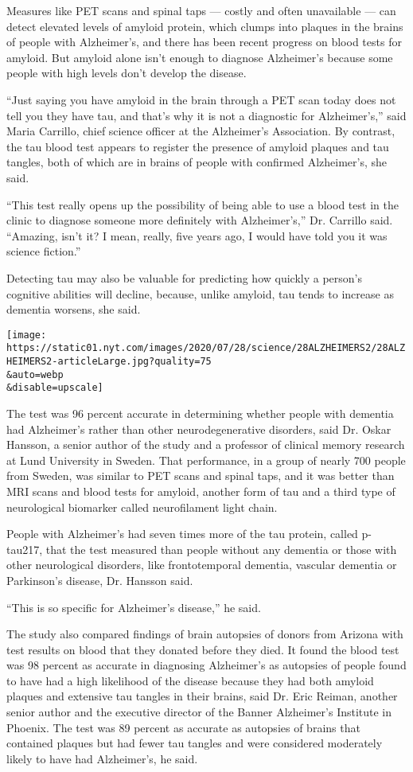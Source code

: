 Measures like PET scans and spinal taps --- costly and often unavailable
--- can detect elevated levels of amyloid protein, which clumps into
plaques in the brains of people with Alzheimer's, and there has been
recent progress on blood tests for amyloid. But amyloid alone isn't
enough to diagnose Alzheimer's because some people with high levels
don't develop the disease.

``Just saying you have amyloid in the brain through a PET scan today
does not tell you they have tau, and that's why it is not a diagnostic
for Alzheimer's,'' said Maria Carrillo, chief science officer at the
Alzheimer's Association. By contrast, the tau blood test appears to
register the presence of amyloid plaques and tau tangles, both of which
are in brains of people with confirmed Alzheimer's, she said.

``This test really opens up the possibility of being able to use a blood
test in the clinic to diagnose someone more definitely with
Alzheimer's,'' Dr. Carrillo said. ``Amazing, isn't it? I mean, really,
five years ago, I would have told you it was science fiction.''

Detecting tau may also be valuable for predicting how quickly a person's
cognitive abilities will decline, because, unlike amyloid, tau tends to
increase as dementia worsens, she said.

\texttt{[image: https://static01.nyt.com/images/2020/07/28/science/28ALZHEIMERS2/28ALZHEIMERS2-articleLarge.jpg?quality=75\\\&auto=webp\\\&disable=upscale]}

The test was 96 percent accurate in determining whether people with
dementia had Alzheimer's rather than other neurodegenerative disorders,
said Dr. Oskar Hansson, a senior author of the study and a professor of
clinical memory research at Lund University in Sweden. That performance,
in a group of nearly 700 people from Sweden, was similar to PET scans
and spinal taps, and it was better than MRI scans and blood tests for
amyloid, another form of tau and a third type of neurological biomarker
called neurofilament light chain.

People with Alzheimer's had seven times more of the tau protein, called
p-tau217, that the test measured than people without any dementia or
those with other neurological disorders, like frontotemporal dementia,
vascular dementia or Parkinson's disease, Dr. Hansson said.

``This is so specific for Alzheimer's disease,'' he said.

The study also compared findings of brain autopsies of donors from
Arizona with test results on blood that they donated before they died.
It found the blood test was 98 percent as accurate in diagnosing
Alzheimer's as autopsies of people found to have had a high likelihood
of the disease because they had both amyloid plaques and extensive tau
tangles in their brains, said Dr. Eric Reiman, another senior author and
the executive director of the Banner Alzheimer's Institute in Phoenix.
The test was 89 percent as accurate as autopsies of brains that
contained plaques but had fewer tau tangles and were considered
moderately likely to have had Alzheimer's, he said.

